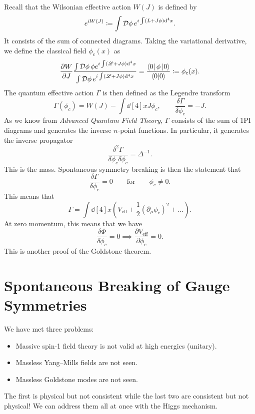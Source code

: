 Recall that the Wilsonian effective action $W(J)$ is defined by
\begin{equation}
  e^{i W(J)} \coloneqq \int \mathop{\mathcal{D} \phi} e^{i \int (L + J \phi) \dd[4]{x}}.
\end{equation}
It consists of the sum of connected diagrams.
Taking the variational derivative, we define the classical field $\phi_c(x)$ as
\begin{equation}
  \frac{\partial W}{\partial J} \frac{\int \mathop{\mathcal{D} \phi} \phi e^{i \int (\mathscr{L} + J \phi) \dd[4]{x}}}{\int \mathop{\mathcal{D} \phi} e^{i \int (\mathscr{L} + J \phi) \dd[4]{x}}}
  = \frac{\bra{0} \phi \ket{0}}{\bra{0} \ket{0}} \coloneqq \phi_c(x).
\end{equation}
The quantum effective action $\Gamma$ is then defined as the Legendre transform
\begin{equation}
  \Gamma(\phi_c) = W(J) - \int \dd[4]{x} J \phi_c, \qquad \frac{\delta \Gamma}{\delta \phi_c} = - J.
\end{equation}
As we know from \emph{Advanced Quantum Field Theory}, $\Gamma$ consists of the sum of 1PI diagrams and generates the inverse $n$-point functions. In particular, it generates the inverse propagator
\begin{equation}
  \frac{\delta^2 \Gamma}{\delta \phi_c \delta \phi_c} = \Delta^{-1}.
\end{equation}
This is the mass. Spontaneous symmetry breaking is then the statement that
\begin{equation}
  \frac{\delta \Gamma}{\delta \phi_c} = 0 \qquad \text{for} \qquad \phi_c \neq 0.
\end{equation}
This means that
\begin{equation}
  \Gamma = \int \dd[4]{x} \left( V_{\text{eff}} + \frac{1}{2} (\partial_{\mu} \phi_c)^2 + \dots \right).
\end{equation}
At zero momentum, this means that we have
\begin{equation}
  \frac{\delta \Phi}{\delta \phi_c} = 0 \implies \frac{\partial V_{\text{eff}}}{\partial \phi_c} = 0.
\end{equation}
This is another proof of the Goldstone theorem.


\section{Spontaneous Breaking of Gauge Symmetries}%
\label{sec:spontaneous_breaking_of_gauge_symmetries}

We have met three problems:
\begin{itemize}
  \item Massive spin-1 field theory is not valid at high energies (unitary).
  \item Massless Yang--Mills fields are not seen.
  \item Massless Goldstone modes are not seen.
\end{itemize}
The first is physical but not consistent while the last two are consistent but not physical! We can address them all at once with the Higgs mechanism.

